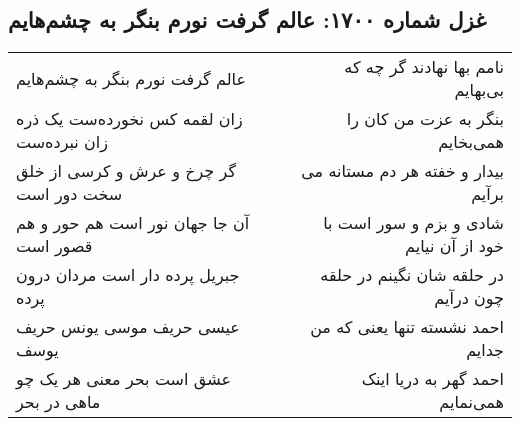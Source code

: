 \begin{center}
\section*{غزل شماره ۱۷۰۰: عالم گرفت نورم بنگر به چشم‌هایم}
\label{sec:1700}
\begin{longtable}{l p{0.5cm} r}
عالم گرفت نورم بنگر به چشم‌هایم
&&
نامم بها نهادند گر چه که بی‌بهایم
\\
زان لقمه کس نخورده‌ست یک ذره زان نبرده‌ست
&&
بنگر به عزت من کان را همی‌بخایم
\\
گر چرخ و عرش و کرسی از خلق سخت دور است
&&
بیدار و خفته هر دم مستانه می برآیم
\\
آن جا جهان نور است هم حور و هم قصور است
&&
شادی و بزم و سور است با خود از آن نیایم
\\
جبریل پرده دار است مردان درون پرده
&&
در حلقه شان نگینم در حلقه چون درآیم
\\
عیسی حریف موسی یونس حریف یوسف
&&
احمد نشسته تنها یعنی که من جدایم
\\
عشق است بحر معنی هر یک چو ماهی در بحر
&&
احمد گهر به دریا اینک همی‌نمایم
\\
\end{longtable}
\end{center}
